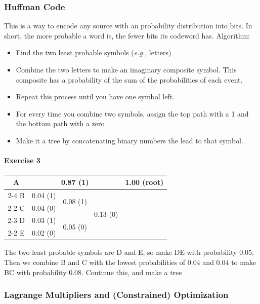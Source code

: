 \documentclass[12pt]{article}
\begin{document}
\subsubsection{Huffman Code}
This is a way to encode any source with an probability distribution into bits. In short, the more probable a word is, the fewer bits its codeword has.
Algorithm:
\begin{itemize}
    \item Find the two least probable symbols (\textit{e.g.}, letters)
    \item Combine the two letters to make an imaginary composite symbol. This composite has a probability of the sum of the probabilities of each event.
    \item Repeat this process until you have one symbol left.
    \item For every time you combine two symbols, assign the top path with a 1 and the bottom path with a zero
    \item Make it a tree by concatenating binary numbers the lead to that symbol.
\end{itemize}

\paragraph{Exercise 3}

\begin{tabular}{|c | c | c | c| c|}
    \hline
    A & \multicolumn{3}{c|}{0.87 (1)} & \multirow{5}{*}{1.00 (root)} \\
    \cline{2-4}
    B & 0.04 (1) & \multirow{2}{*}{0.08 (1)} & \multirow{4}{*}{0.13 (0)} & \\
    \cline{2-2}
    C & 0.04 (0) & & & \\
    \cline{2-3}
    D & 0.03 (1) & \multirow{2}{*}{0.05 (0)} & & \\
    \cline{2-2}
    E & 0.02 (0) & & & \\
    \hline
\end{tabular}

\medskip
The two least probable symbols are D and E, so make DE with probability 0.05. Then we combine B and C with the lowest probabilities of 0.04 and 0.04 to make BC with probability 0.08. Continue this, and make a tree


\subsubsection{Lagrange Multipliers and (Constrained) Optimization}
\end{document}
